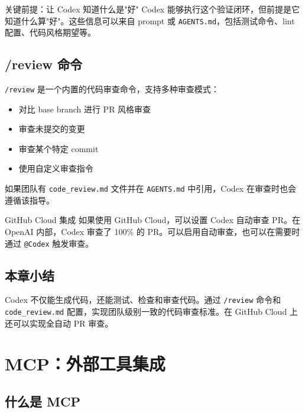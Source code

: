 \documentclass[a4paper]{article}
\begin{document}
\begin{importantbox}{关键前提：让 Codex 知道什么是"好"}
Codex 能够执行这个验证闭环，但前提是它知道什么算"好"。这些信息可以来自 prompt 或 \texttt{AGENTS.md}，包括测试命令、lint 配置、代码风格期望等。
\end{importantbox}

\subsection{/review 命令}

\texttt{/review} 是一个内置的代码审查命令，支持多种审查模式：

\begin{itemize}
    \item 对比 base branch 进行 PR 风格审查
    \item 审查未提交的变更
    \item 审查某个特定 commit
    \item 使用自定义审查指令
\end{itemize}

如果团队有 \texttt{code\_review.md} 文件并在 \texttt{AGENTS.md} 中引用，Codex 在审查时也会遵循该指导。

\begin{knowledgebox}{GitHub Cloud 集成}
如果使用 GitHub Cloud，可以设置 Codex 自动审查 PR。在 OpenAI 内部，Codex 审查了 100\% 的 PR。可以启用自动审查，也可以在需要时通过 \texttt{@Codex} 触发审查。
\end{knowledgebox}

\subsection{本章小结}

Codex 不仅能生成代码，还能测试、检查和审查代码。通过 \texttt{/review} 命令和 \texttt{code\_review.md} 配置，实现团队级别一致的代码审查标准。在 GitHub Cloud 上还可以实现全自动 PR 审查。

\section{MCP：外部工具集成}

\subsection{什么是 MCP}
\end{document}
